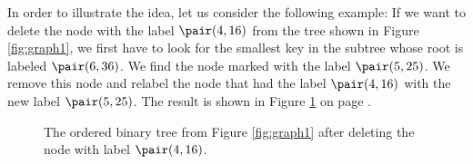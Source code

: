 In order to illustrate the idea, let us consider the following example: 
If we want to delete the node with the label  $\pair(4,16)$ from the tree shown in Figure
\ref{fig:graph1}, we first have to look for the smallest key in the subtree whose root is labeled
$\pair(6,36)$.  We find the node marked with the label $\pair(5,25)$.  We remove this node and
relabel the node that had the label $\pair(4,16)$ with the new label $\pair(5,25)$.  The result is
shown in Figure \ref{fig:graph2} on page \pageref{fig:graph2}.

\begin{figure}[!th]
  \centering
  \caption{The ordered binary tree from Figure  
          \ref{fig:graph1} after deleting the node with label $\pair(4,16)$.}
  \label{fig:graph2}
\end{figure}

